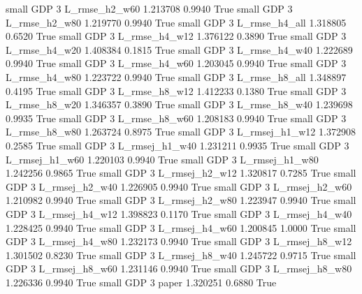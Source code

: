      small      GDP                 3  L_rmse_h2_w60   1.213708      0.9940    True
     small      GDP                 3  L_rmse_h2_w80   1.219770      0.9940    True
     small      GDP                 3  L_rmse_h4_all   1.318805      0.6520    True
     small      GDP                 3  L_rmse_h4_w12   1.376122      0.3890    True
     small      GDP                 3  L_rmse_h4_w20   1.408384      0.1815    True
     small      GDP                 3  L_rmse_h4_w40   1.222689      0.9940    True
     small      GDP                 3  L_rmse_h4_w60   1.203045      0.9940    True
     small      GDP                 3  L_rmse_h4_w80   1.223722      0.9940    True
     small      GDP                 3  L_rmse_h8_all   1.348897      0.4195    True
     small      GDP                 3  L_rmse_h8_w12   1.412233      0.1380    True
     small      GDP                 3  L_rmse_h8_w20   1.346357      0.3890    True
     small      GDP                 3  L_rmse_h8_w40   1.239698      0.9935    True
     small      GDP                 3  L_rmse_h8_w60   1.208183      0.9940    True
     small      GDP                 3  L_rmse_h8_w80   1.263724      0.8975    True
     small      GDP                 3 L_rmsej_h1_w12   1.372908      0.2585    True
     small      GDP                 3 L_rmsej_h1_w40   1.231211      0.9935    True
     small      GDP                 3 L_rmsej_h1_w60   1.220103      0.9940    True
     small      GDP                 3 L_rmsej_h1_w80   1.242256      0.9865    True
     small      GDP                 3 L_rmsej_h2_w12   1.320817      0.7285    True
     small      GDP                 3 L_rmsej_h2_w40   1.226905      0.9940    True
     small      GDP                 3 L_rmsej_h2_w60   1.210982      0.9940    True
     small      GDP                 3 L_rmsej_h2_w80   1.223947      0.9940    True
     small      GDP                 3 L_rmsej_h4_w12   1.398823      0.1170    True
     small      GDP                 3 L_rmsej_h4_w40   1.228425      0.9940    True
     small      GDP                 3 L_rmsej_h4_w60   1.200845      1.0000    True
     small      GDP                 3 L_rmsej_h4_w80   1.232173      0.9940    True
     small      GDP                 3 L_rmsej_h8_w12   1.301502      0.8230    True
     small      GDP                 3 L_rmsej_h8_w40   1.245722      0.9715    True
     small      GDP                 3 L_rmsej_h8_w60   1.231146      0.9940    True
     small      GDP                 3 L_rmsej_h8_w80   1.226336      0.9940    True
     small      GDP                 3          paper   1.320251      0.6880    True
